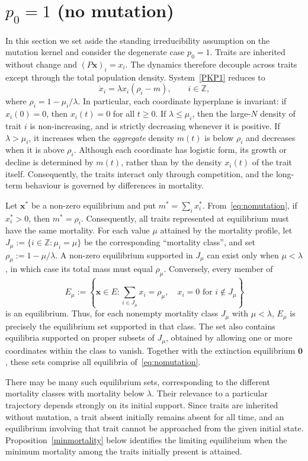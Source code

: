 \documentclass[12pt]{article}
\newcommand{\Z}{\ensuremath{\mathbb Z}}
\newcommand{\bzero}{\boldsymbol{0}}
\newcommand{\ts}{\textstyle}
\newcommand{\bx}{\boldsymbol{x}}
\begin{document}
\section{$p_0=1$ (no mutation)}
\label{sec:nomutation}

In this section we set aside the standing irreducibility assumption on
the mutation kernel and consider the degenerate case $p_0=1$.
Traits are inherited without change and
$(P\bx)_i=x_i$. The dynamics therefore decouple across traits except
through the total population density. System~\eqref{PKP1} reduces to
\begin{equation}
\dot x_i=\lambda x_i(\rho_i-m),\qquad i\in\Z,
\label{eq:nomutation}
\end{equation} 
where $\rho_i=1-\mu_i/\lambda$. In particular, each coordinate
hyperplane is invariant: if $x_i(0)=0$, then $x_i(t)=0$ for all
$t\geq0$. If $\lambda\leq\mu_i$, then the large-$N$ density of trait $i$
is non-increasing, and is strictly decreasing whenever it is positive.
If $\lambda>\mu_i$, it increases when the \emph{aggregate} density
$m(t)$ is below $\rho_i$ and decreases when it is above $\rho_i$.
Although each coordinate has logistic form, its growth or decline is
determined by $m(t)$, rather than by the density $x_i(t)$ of the trait
itself. Consequently, the traits interact only through competition, 
and the long-term behaviour is governed by differences in mortality.

Let $\bx^*$ be a non-zero equilibrium and put $m^*=\sum_i x_i^*$.
From~\eqref{eq:nomutation}, if $x_i^*>0$, then $m^*=\rho_i$. Consequently,
all traits represented at equilibrium must have the same mortality. For
each value $\mu$ attained by the mortality profile, let 
$J_\mu:=\{i\in\Z:\mu_i=\mu\}$ be the corresponding ``mortality class'', and
set $\rho_\mu:=1-\mu/\lambda$. A non-zero equilibrium supported in
$J_\mu$ can exist only when $\mu<\lambda$, in which case its total mass
must equal $\rho_\mu$. Conversely, every member of 
$$
E_\mu := \left\{ \bx\in E: {\ts\sum_{i\in J_\mu}x_i}=\rho_\mu,
\quad x_i=0\text{ for }i\notin J_\mu \right\}
$$
is an equilibrium. Thus, for each nonempty mortality class $J_\mu$ with
$\mu<\lambda$, $E_\mu$ is precisely the equilibrium set supported in
that class. 
The set also contains equilibria supported on proper subsets of $J_\mu$,
obtained by allowing one or more coordinates within the class to vanish.
Together with the extinction equilibrium $\bzero$,
these sets comprise all equilibria of~\eqref{eq:nomutation}.

There may be many such equilibrium sets, corresponding to the
different mortality classes with mortality below $\lambda$. Their
relevance to a particular trajectory depends strongly on its initial
support. Since traits are inherited without mutation, a trait absent
initially remains absent for all time, and an equilibrium involving that
trait cannot be approached from the given initial state.
Proposition~\ref{minmortality} below identifies the limiting equilibrium
when the minimum mortality among the traits initially present is
attained.
\end{document}
